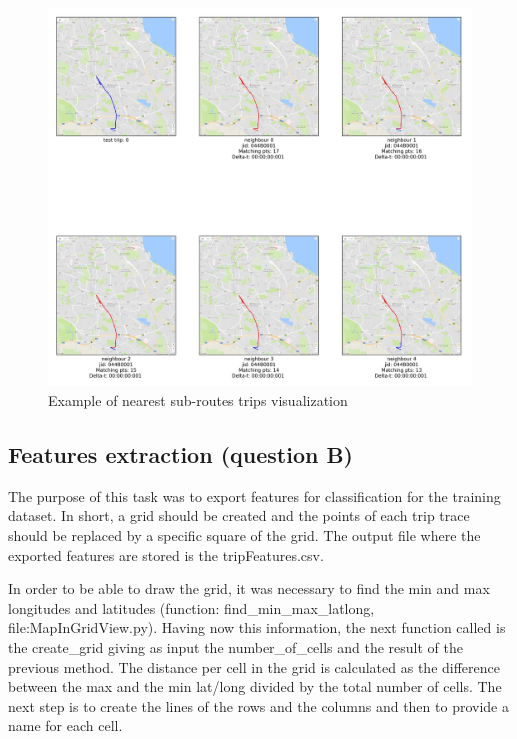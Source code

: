 \documentclass[12pt]{article}
\begin{document}
	\begin{figure} [H]
		\begin{center}
			\includegraphics [scale = 0.50] {question2a2example.jpg}
			\caption{Example of nearest sub-routes trips visualization}
		\end{center}
	\end{figure} 
	
	\subsection{Features extraction (question B)}
	The purpose of this task was to export features for classification for the training dataset. In short, a grid should be created and the points of each trip trace should be replaced by a specific square of the grid. The output file where the exported features are stored is the tripFeatures.csv.
	
	In order to be able to draw the grid, it was necessary to find the min and max longitudes and latitudes (function: find\_min\_max\_latlong, file:MapInGridView.py). Having now this information, the next function called is the create\_grid giving as input the number\_of\_cells and the result of the previous method. The distance per cell in the grid is calculated as the difference between the max and the min lat/long divided by the total number of cells. The next step is to create the lines of the rows and the columns and then to provide a name for each cell.
	
\end{document}
